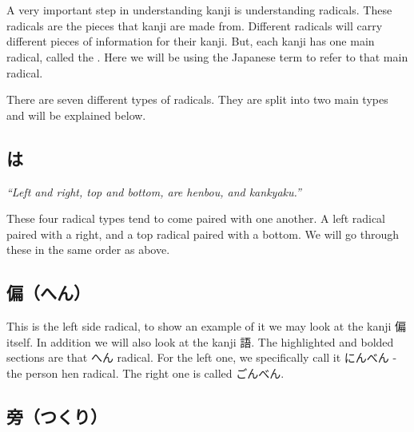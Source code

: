 \section[部首]{}\label{sec:PR;漢字;部首}

A very important step in understanding kanji is understanding radicals. These radicals are the pieces that kanji are made from. Different radicals will carry different pieces of information for their kanji. But, each kanji has one main radical, called the . Here we will be using the Japanese term to refer to that main radical.

There are seven different types of radicals. They are split into two main types and will be explained below.

\subsection*{は}\label{ssec:PR;漢字;部首;左右上下は偏旁冠脚}

\hspace*{24pt}\textit{``Left and right, top and bottom, are henbou, and kankyaku.''}

These four radical types tend to come paired with one another. A left radical paired with a right, and a top radical paired with a bottom. We will go through these in the same order as above.

\subsection*{偏（へん）}\label{ssec:PR;漢字;部首;へん}

This is the left side radical, to show an example of it we may look at the kanji 偏 itself. In addition we will also look at the kanji 語. The highlighted and bolded sections are that へん radical. For the left one, we specifically call it にんべん - the person hen radical. The right one is called ごんべん.

\begin{figure}[H]\label{fig:PR;漢字;部首;へん}
	\centering
	
	\hspace{0.5in}
	
\end{figure}

\subsection*{旁（つくり）}\label{ssec:PR;漢字;部首;つくり}

